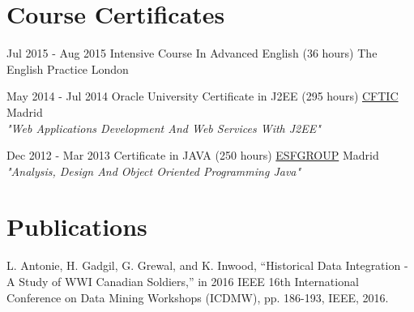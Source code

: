 \documentclass[letterpaper]{twentysecondcv} %
\begin{document}
\section{Course Certificates}
\begin{twenty}
	\twentyitem
    	{Jul 2015 -}
		{Aug 2015}
        {Intensive Course In Advanced English (36 hours)}
        {The English Practice}
        {}
        {London}
\end{twenty}

\begin{twenty}
	\twentyitem
    	{May 2014 -}
		{Jul 2014}
        {Oracle University Certificate in J2EE (295 hours)}
        {\href{https://cftic.centrosdeformacion.empleo.madrid.org/}{CFTIC}}
        {}
        {Madrid\\
        \textit{"Web Applications Development And Web Services With J2EE"}}      
\end{twenty}

\begin{twenty}
	\twentyitem
    	{Dec 2012 -}
		{Mar 2013}
        {Certificate in JAVA (250 hours)}
        {\href{http://www.esf.es/}{ESFGROUP}}
        {}
        {Madrid\\
        \textit{"Analysis, Design And Object Oriented Programming Java"}}      
\end{twenty}

\section{Publications}
L. Antonie, H. Gadgil, G. Grewal, and K. Inwood, “Historical Data Integration - A Study of WWI Canadian Soldiers,” in 2016 IEEE 16th International Conference on Data Mining Workshops (ICDMW), pp. 186-193, IEEE, 2016. \vspace{2mm}
\end{document}
